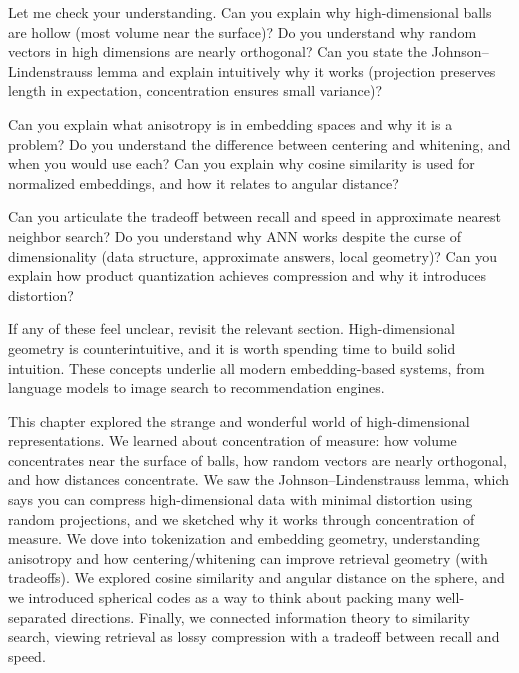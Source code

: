 \vspace{2em}


\begin{pausebox}
Let me check your understanding. Can you explain why high-dimensional balls are hollow (most volume near the surface)? Do you understand why random vectors in high dimensions are nearly orthogonal? Can you state the Johnson--Lindenstrauss lemma and explain intuitively why it works (projection preserves length in expectation, concentration ensures small variance)?

\vspace{0.5em}

Can you explain what anisotropy is in embedding spaces and why it is a problem? Do you understand the difference between centering and whitening, and when you would use each? Can you explain why cosine similarity is used for normalized embeddings, and how it relates to angular distance?

\vspace{0.5em}

Can you articulate the tradeoff between recall and speed in approximate nearest neighbor search? Do you understand why ANN works despite the curse of dimensionality (data structure, approximate answers, local geometry)? Can you explain how product quantization achieves compression and why it introduces distortion?

\vspace{0.5em}

If any of these feel unclear, revisit the relevant section. High-dimensional geometry is counterintuitive, and it is worth spending time to build solid intuition. These concepts underlie all modern embedding-based systems, from language models to image search to recommendation engines.
\end{pausebox}

\vspace{1em}

This chapter explored the strange and wonderful world of high-dimensional representations. We learned about concentration of measure: how volume concentrates near the surface of balls, how random vectors are nearly orthogonal, and how distances concentrate. We saw the Johnson--Lindenstrauss lemma, which says you can compress high-dimensional data with minimal distortion using random projections, and we sketched why it works through concentration of measure. We dove into tokenization and embedding geometry, understanding anisotropy and how centering/whitening can improve retrieval geometry (with tradeoffs). We explored cosine similarity and angular distance on the sphere, and we introduced spherical codes as a way to think about packing many well-separated directions. Finally, we connected information theory to similarity search, viewing retrieval as lossy compression with a tradeoff between recall and speed.


